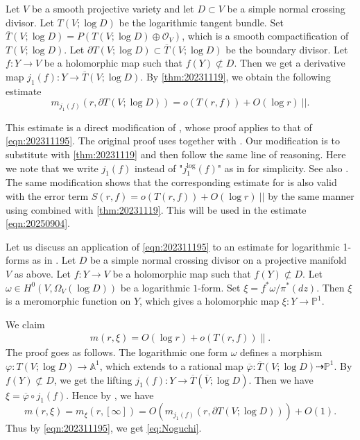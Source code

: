 \documentclass[11pt,english]{smfart}
\theoremstyle{plain}
\theoremstyle{definition}
\theoremstyle{remark}
\numberwithin{equation}{section}
\theoremstyle{plain}
\newcommand{\bP}{\mathbb{P}}
\begin{document}
	Let $V$ be a smooth projective variety and let $D\subset V$ be a simple normal crossing divisor.
	Let $T(V;\log D)$ be the logarithmic tangent bundle. 
	Set $\overline{T}(V;\log D)=P(T(V;\log D)\oplus \mathcal{O}_V)$, which is a smooth compactification of $T(V;\log D)$.
	Let $\partial T(V;\log D)\subset \overline{T}(V;\log D)$ be the boundary divisor.
	Let $f:Y\to V$ be a holomorphic map such that $f(Y)\not\subset D$.
	Then we get a derivative map $j_1(f):Y\to \overline{T}(V;\log D)$.
	By \cref{thm:20231119}, we obtain the following estimate
	\begin{equation}\label{eqn:202311195}
		m_{j_1 (f)}(r,\partial T(V;\log D))=o(T(r,f))+O(\log r)\ ||.
	\end{equation}
	
	This estimate is a direct modification of \cite[Thm 5.1.7 (2)]{Yam04}, whose proof applies to that of \eqref{eqn:202311195}.
	The original proof uses\cite[Prop 5.1.2 (1)]{Yam04} together with \cite[Thm 2.5.1 (2)]{Yam04}. 
	Our modification is to substitute \cite[Thm 2.5.1 (2)]{Yam04} with \cref{thm:20231119} and then follow the same line of reasoning.
	Here we note that we write $j_1 (f)$ instead of "$j_1^{\log} (f)$" as in \cite{Yam04} for simplicity.
	See also \cite[Appendix A]{Vojta2000abc}.
	 The same modification shows that the corresponding estimate for \cite[Thm 5.1.7 (1)]{Yam04} is also valid with the error term $S(r,f)=o(T(r,f))+O(\log r)\ ||$ by the same manner using \cite[Prop 5.1.2 (2)]{Yam04} combined with \cref{thm:20231119}.
	 This will be used in the estimate \eqref{eqn:20250904}.
	 
	 
	 
Let us discuss an application of \eqref{eqn:202311195} to an estimate for logarithmic 1-forms as in \cite{Nog81}.
Let $D$ be a simple normal crossing divisor on a projective manifold $V$ as above.
Let $f:Y\to V$ be a holomorphic map such that $f(Y)\not\subset D$. 
Let $\omega \in H^{0}\left(V, \Omega_{V}(\log D)\right)$ be a logarithmic \(1\)-form. 
 Set $\xi=f^{*} \omega / \pi^{*}(d z)$. 
 Then $\xi$ is a meromorphic function on $Y$, which gives a holomorphic map $\xi:Y\to \bP^1$.  

We claim 
\begin{align}\label{eq:Noguchi}
	 m(r,\xi)=O(\log r)+o(T(r,f))\lVert. 
\end{align}  
The proof goes as follows. 
The logarithmic one form $\omega$ defines a morphism $\varphi:T(V;\log D)\to \mathbb A^1$, which extends to a rational map $\overline{\varphi}:\overline{T}(V;\log D)\dashrightarrow \mathbb P^1$.
By $f(Y)\not\subset D$, we get the lifting $j_1(f):Y\to \overline{T}(\overline{V};\log D)$.
Then we have $\xi=\overline{\varphi}\circ j_1(f)$.
Hence by \cite[Prop 2.3.2 (6)]{Yam04}, we have
$$
m(r, \xi)=m_{\xi}(r,[\infty])=O(m_{j_1(f)}(r,\partial T(V;\log D)))+O(1).$$
Thus by \eqref{eqn:202311195}, we get \eqref{eq:Noguchi}.
\end{document}
